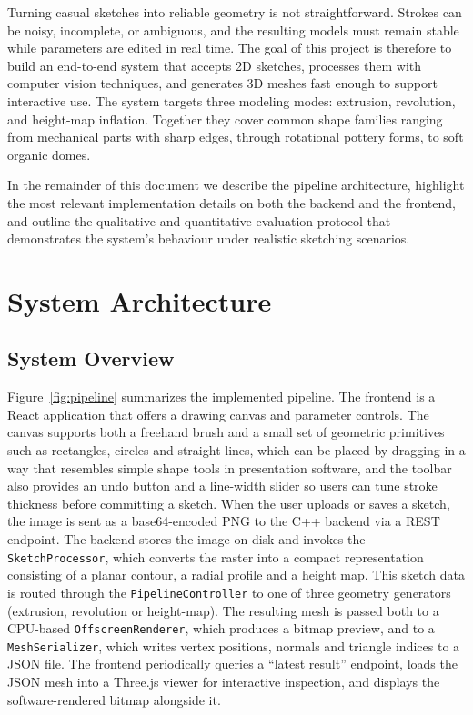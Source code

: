 \documentclass[11pt, a4paper]{article}
\begin{document}
Turning casual sketches into reliable geometry is not straightforward. Strokes can be noisy, incomplete, or ambiguous, and the resulting models must remain stable while parameters are edited in real time. The goal of this project is therefore to build an end-to-end system that accepts 2D sketches, processes them with computer vision techniques, and generates 3D meshes fast enough to support interactive use. The system targets three modeling modes: extrusion, revolution, and height-map inflation. Together they cover common shape families ranging from mechanical parts with sharp edges, through rotational pottery forms, to soft organic domes.

In the remainder of this document we describe the pipeline architecture, highlight the most relevant implementation details on both the backend and the frontend, and outline the qualitative and quantitative evaluation protocol that demonstrates the system's behaviour under realistic sketching scenarios.

\section{System Architecture}
\subsection{System Overview}
Figure~\ref{fig:pipeline} summarizes the implemented pipeline. The frontend is a React application that offers a drawing canvas and parameter controls. The canvas supports both a freehand brush and a small set of geometric primitives such as rectangles, circles and straight lines, which can be placed by dragging in a way that resembles simple shape tools in presentation software, and the toolbar also provides an undo button and a line-width slider so users can tune stroke thickness before committing a sketch. When the user uploads or saves a sketch, the image is sent as a base64-encoded PNG to the C++ backend via a REST endpoint. The backend stores the image on disk and invokes the \texttt{SketchProcessor}, which converts the raster into a compact representation consisting of a planar contour, a radial profile and a height map. This sketch data is routed through the \texttt{PipelineController} to one of three geometry generators (extrusion, revolution or height-map). The resulting mesh is passed both to a CPU-based \texttt{OffscreenRenderer}, which produces a bitmap preview, and to a \texttt{MeshSerializer}, which writes vertex positions, normals and triangle indices to a JSON file. The frontend periodically queries a ``latest result'' endpoint, loads the JSON mesh into a Three.js viewer for interactive inspection, and displays the software-rendered bitmap alongside it.
\end{document}
